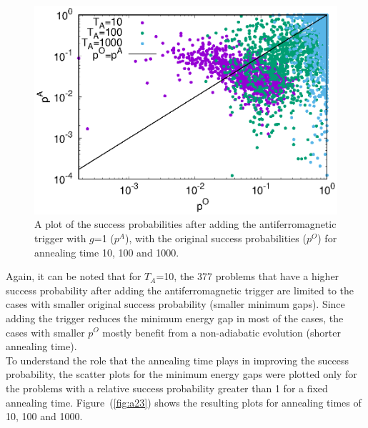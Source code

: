 \documentclass[../main.tex]{subfiles}
\begin{document}
\begin{figure}
\centering 
\includegraphics[scale=0.8]{ProbScat_g1.eps}
\caption{A plot of the success probabilities after adding the antiferromagnetic trigger with $g$=1 ($p^A$), with the original success probabilities ($p^O$) for annealing time 10, 100 and 1000.}
\label{fig:a22}
\end{figure}

Again, it can be noted that for $T_A$=10, the 377 problems that have a higher success probability after adding the antiferromagnetic trigger are limited to the cases with smaller original success probability (smaller minimum gaps). Since adding the trigger reduces the minimum energy gap in most of the cases, the cases with smaller $p^O$ mostly benefit from a non-adiabatic evolution (shorter annealing time).\\

To understand the role that the annealing time plays in improving the success probability, the scatter plots for the minimum energy gaps were plotted only for the problems with a relative success probability greater than 1 for a fixed annealing time. Figure~(\ref{fig:a23}) shows the resulting plots for annealing times of 10, 100 and 1000.\\
\end{document}
